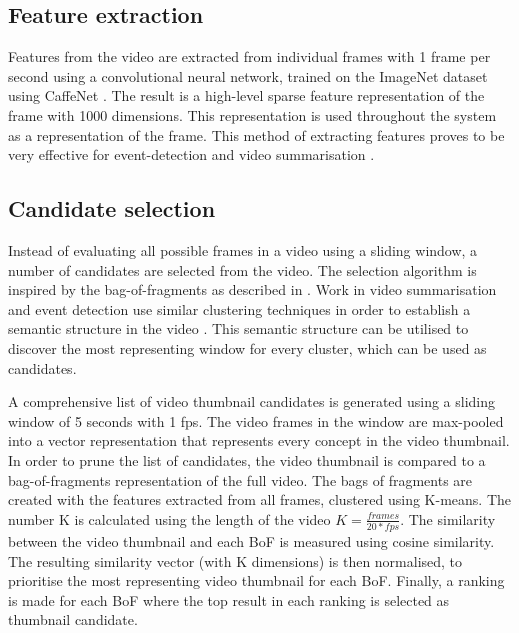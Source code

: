 \documentclass{../resources/sig-alternate-05-2015}
\begin{document}
\subsection{Feature extraction}
\label{feature extraction}
Features from the video are extracted from individual frames with 1 frame per second using a convolutional neural network, trained on the ImageNet dataset \cite{Krizhevsky:2012wl} using CaffeNet \cite{Jia:2014cm}. The result is a high-level sparse feature representation of the frame with 1000 dimensions. This representation is used throughout the system as a representation of the frame. This method of extracting features proves to be very effective for event-detection \cite{Habibian:2013ks,Althoff:2012gf,Jiang:2012fy} and video summarisation \cite{Ajmal:2012hi,Mazloom:2015el}.

\subsection{Candidate selection}
\label{candidate selection}

Instead of evaluating all possible frames in a video using a sliding window, a number of candidates are selected from the video. The selection algorithm is inspired by the bag-of-fragments as described in \cite{Mettes:2015vg}. Work in video summarisation and event detection use similar clustering techniques in order to establish a semantic structure in the video \cite{Yuan:2011fu,Habibian:2014dc}. This semantic structure can be utilised to discover the most representing window for every cluster, which can be used as candidates.

A comprehensive list of video thumbnail candidates is generated using a sliding window of 5 seconds with 1 fps. The video frames in the window are max-pooled into a vector representation that represents every concept in the video thumbnail. In order to prune the list of candidates, the video thumbnail is compared to a bag-of-fragments representation of the full video. The bags of fragments are created with the features extracted from all frames, clustered using K-means. The number K is calculated using the length of the video $K = \frac{frames}{20 * fps}$. The similarity between the video thumbnail and each BoF is measured using cosine similarity. The resulting similarity vector (with K dimensions) is then normalised, to prioritise the most representing video thumbnail for each BoF. Finally, a ranking is made for each BoF where the top result in each ranking is selected as thumbnail candidate.
\end{document}
